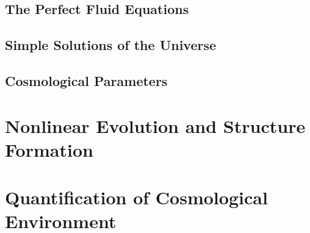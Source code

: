 	\subsection{The Perfect Fluid Equations}
	\label{subsec:ThePerfectFluidEquations}


	\subsection{Simple Solutions of the Universe}
	\label{subsec:SimpleSolutionsOfTheUniverse}


	\subsection{Cosmological Parameters}
	\label{subsec:CosmologicalParameters}






\section{Nonlinear Evolution and Structure Formation}
\label{sec:NonlinearEvolutionAndStructureFormation}




\section{Quantification of Cosmological Environment}
\label{sec:QuantificationOfCosmologicalEnvironment}


